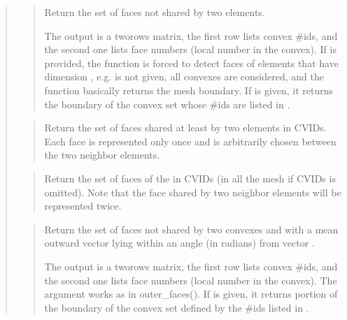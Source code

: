 \documentclass[a4paper,11pt,english]{sphinxmanual}
\begin{document}
\begin{quote}
\begin{quote}
\sphinxAtStartPar
Return the set of faces not shared by two elements.

\sphinxAtStartPar
The output  is a two\sphinxhyphen{}rows matrix, the first row lists
convex \#ids, and the second one lists face numbers (local number
in the convex). If  is provided, the function is forced to
detect faces of elements that have dimension , e.g.  is not given, all convexes are considered, and the
function basically returns the mesh boundary. If 
is given, it returns the boundary of the convex set whose \#ids are
listed in .
\end{quote}

\sphinxAtStartPar
{}
\begin{quote}

\sphinxAtStartPar
Return the set of faces shared at least by two elements in CVIDs.
Each face is represented only once and is arbitrarily chosen
between the two neighbor elements.
\end{quote}

\sphinxAtStartPar
{}
\begin{quote}

\sphinxAtStartPar
Return the set of faces of the in CVIDs (in all the mesh if CVIDs is
omitted). Note that the face shared by two neighbor elements will be
represented twice.
\end{quote}

\sphinxAtStartPar
{}
\begin{quote}

\sphinxAtStartPar
Return the set of faces not shared by two convexes and with a mean outward vector lying within an angle  (in radians) from vector .

\sphinxAtStartPar
The output  is a two\sphinxhyphen{}rows matrix, the first row lists convex
\#ids, and the second one lists face numbers (local number in the
convex). The argument  works as in outer\_faces().
If  is given, it returns portion of the boundary of
the convex set defined by the \#ids listed in .
\end{quote}


\end{quote}
\end{document}

